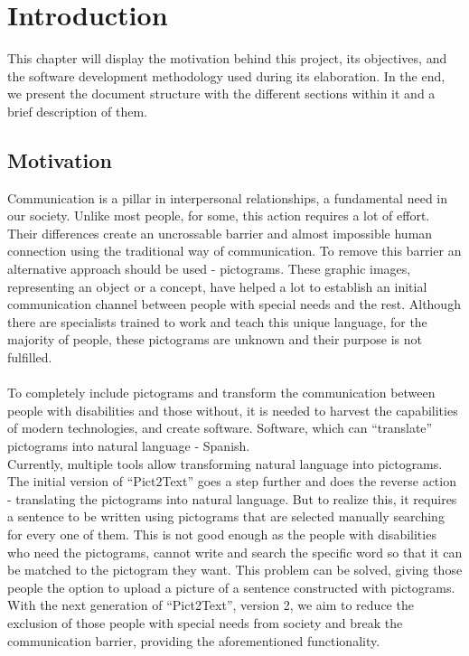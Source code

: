 
\chapter{Introduction}
\label{cap:introduction}

This chapter will display the motivation behind this project, its objectives, and the software development methodology used during its elaboration. In the end, we present the document structure with the different sections within it and a brief description of them.

\section{Motivation}
Communication is a pillar in interpersonal relationships, a fundamental need in our society. Unlike most people, for some, this action requires a lot of effort. Their differences create an uncrossable barrier and almost impossible human connection using the traditional way of communication. To remove this barrier an alternative approach should be used - pictograms. These graphic images, representing an object or a concept, have helped a lot to establish an initial communication channel between people with special needs and the rest. Although there are specialists trained to work and teach this unique language, for the majority of people, these pictograms are unknown and their purpose is not fulfilled. \\
\\
To completely include pictograms and transform the communication between people with disabilities and those without, it is needed to harvest the capabilities of modern technologies, and create software. Software, which can ``translate'' pictograms into natural language - Spanish. \\
Currently, multiple tools allow transforming natural language into pictograms. The initial version of ``Pict2Text'' goes a step further and does the reverse action - translating the pictograms into natural language. But to realize this, it requires a sentence to be written using pictograms that are selected manually searching for every one of them. This is not good enough as the people with disabilities who need the pictograms, cannot write and search the specific word so that it can be matched to the pictogram they want. This problem can be solved, giving those people the option to upload a picture of a sentence constructed with pictograms. With the next generation of ``Pict2Text'', version 2, we aim to reduce the exclusion of those people with special needs from society and break the communication barrier, providing the aforementioned functionality.\\
